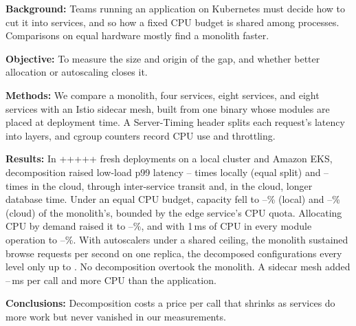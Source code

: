 \noindent\textbf{Background:} Teams running an application on Kubernetes must decide how to cut it into services, and so
how a fixed CPU budget is shared among processes. Comparisons on equal hardware mostly find a monolith faster.

\noindent\textbf{Objective:} To measure the size and origin of the gap, and whether better allocation or autoscaling
closes it.

\noindent\textbf{Methods:} We compare a monolith, four services, eight services, and eight services with an Istio
sidecar mesh, built from one binary whose modules are placed at deployment time. A Server-Timing header splits each
request's latency into layers, and cgroup counters record CPU use and throttling.

\noindent\textbf{Results:} In \the\numexpr{}+++++\relax{} fresh
deployments on a local cluster and Amazon EKS, decomposition raised low-load p99 latency
-- times locally (equal split) and -- times in the cloud,
through inter-service transit and, in the cloud, longer database time. Under an equal CPU budget, capacity fell
to --\% (local) and --\% (cloud) of the
monolith's, bounded by the edge service's CPU quota. Allocating CPU by demand raised it to
--\%, and with 1\,ms of CPU in every module operation to
--\%. With autoscalers under a shared ceiling, the monolith
sustained  browse requests per second on one replica, the decomposed configurations every
level only up to . No decomposition overtook the monolith. A sidecar mesh added
--\,ms per call and more CPU than the application.

\noindent\textbf{Conclusions:} Decomposition costs a price per call that shrinks as services do more work but never
vanished in our measurements.
